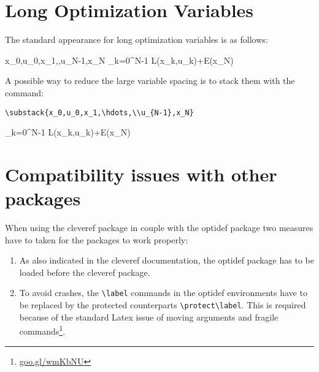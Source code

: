 \documentclass[a4paper]{article}
\begin{document}
\section{Long Optimization Variables}
The standard appearance for long optimization variables is as follows:

\begin{mini!}
	{x_0,u_0,x_1,\hdots,u_{N-1},x_N}
	{\sum_{k=0}^{N-1} L(x_k,u_k)\!\!+\!\!E(x_N)\label{OCPobj}}
	{\label{eq:OCP}}{}
\end{mini!}

\noindent A possible way to reduce the large variable spacing is to stack them with the command: \begin{verbatim}
\substack{x_0,u_0,x_1,\hdots,\\u_{N-1},x_N}
\end{verbatim}

\begin{mini!}
	{}
	{\sum_{k=0}^{N-1} L(x_k,u_k)\!\!+\!\!E(x_N)\label{OCPobj}}
	{\label{eq:OCP}}{}
\end{mini!}

\section{Compatibility issues with other packages}
When using the cleveref package in couple with the optidef package two measures have to taken for the packages to work properly:

\begin{enumerate}
	\item As also indicated in the cleveref documentation, the optidef package has to be loaded before the cleveref package.
	\item To avoid crashes, the \verb|\label| commands in the optidef environments have to be replaced by the protected counterparts \verb|\protect\label|. This is required because of the standard Latex issue of moving arguments and fragile commands\footnote{\url{goo.gl/wmKbNU}}.
\end{enumerate} 
\end{document}
